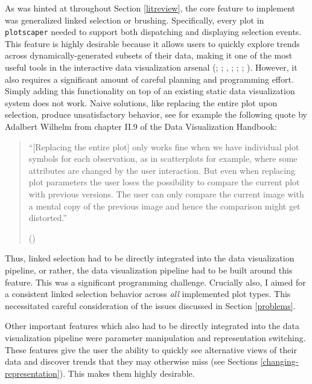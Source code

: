 \documentclass[
]{book}
\theoremstyle{definition}
\theoremstyle{definition}
\theoremstyle{definition}
\theoremstyle{definition}
\theoremstyle{remark}
\begin{document}
As was hinted at throughout Section \ref{litreview}, the core feature to implement was generalized linked selection or brushing. Specifically, every plot in \texttt{plotscaper} needed to support both dispatching and displaying selection events. This feature is highly desirable because it allows users to quickly explore trends across dynamically-generated subsets of their data, making it one of the most useful tools in the interactive data visualization arsenal (; ; , ; ; ; ). However, it also requires a significant amount of careful planning and programming effort. Simply adding this functionality on top of an existing static data visualization system does not work. Naive solutions, like replacing the entire plot upon selection, produce unsatisfactory behavior, see for example the following quote by Adalbert Wilhelm from chapter II.9 of the Data Visualization Handbook:

\begin{quote}
``{[}Replacing the entire plot{]} only works ﬁne when we have individual plot symbols for each observation, as in scatterplots for example, where some attributes are changed by the user interaction. But even when replacing plot parameters the user loses the possibility to compare the current plot with previous versions. The
user can only compare the current image with a mental copy of the previous image and hence the comparison might get distorted.''

()
\end{quote}

Thus, linked selection had to be directly integrated into the data visualization pipeline, or rather, the data visualization pipeline had to be built around this feature. This was a significant programming challenge. Crucially also, I aimed for a consistent linked selection behavior across \emph{all} implemented plot types. This necessitated careful consideration of the issues discussed in Section \ref{problems}.

Other important features which also had to be directly integrated into the data visualization pipeline were parameter manipulation and representation switching. These features give the user the ability to quickly see alternative views of their data and discover trends that they may otherwise miss (see Sections \ref{changing-representation}). This makes them highly desirable.
\end{document}
